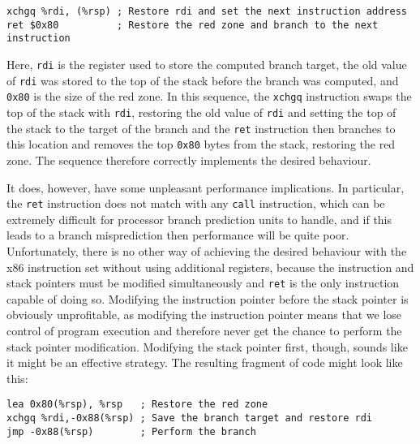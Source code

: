 \begin{verbatim}
xchgq %rdi, (%rsp) ; Restore rdi and set the next instruction address
ret $0x80          ; Restore the red zone and branch to the next instruction
\end{verbatim}

  Here, \verb|rdi| is the
register used to store the computed branch target, the old value of
\verb|rdi| was stored to the top of the stack before the branch was
computed, and \verb|0x80| is the size of the red zone.  In this
sequence, the \verb|xchgq| instruction swaps the top of the stack with
\verb|rdi|, restoring the old value of \verb|rdi| and setting the top
of the stack to the target of the branch and the \verb|ret|
instruction then branches to this location and removes the top
\verb|0x80| bytes from the stack, restoring the red zone.  The
sequence therefore correctly implements the desired behaviour.

It does, however, have some unpleasant performance implications.  In
particular, the \verb|ret| instruction does not match with any
\verb|call| instruction, which can be extremely difficult for
processor branch prediction units to handle\needCite{}, and if this
leads to a branch misprediction then performance will be quite poor.
Unfortunately, there is no other way of achieving the desired
behaviour with the x86 instruction set without using additional
registers, because the instruction and stack pointers must be modified
simultaneously and \verb|ret| is the only instruction capable of doing
so.  Modifying the instruction pointer before the stack pointer is
obviously unprofitable, as modifying the instruction pointer means
that we lose control of program execution and therefore never get the
chance to perform the stack pointer modification.  Modifying the stack
pointer first, though, sounds like it might be an effective strategy.
The resulting fragment of code might look like this:

\begin{verbatim}
lea 0x80(%rsp), %rsp   ; Restore the red zone
xchgq %rdi,-0x88(%rsp) ; Save the branch target and restore rdi
jmp -0x88(%rsp)        ; Perform the branch
\end{verbatim}

